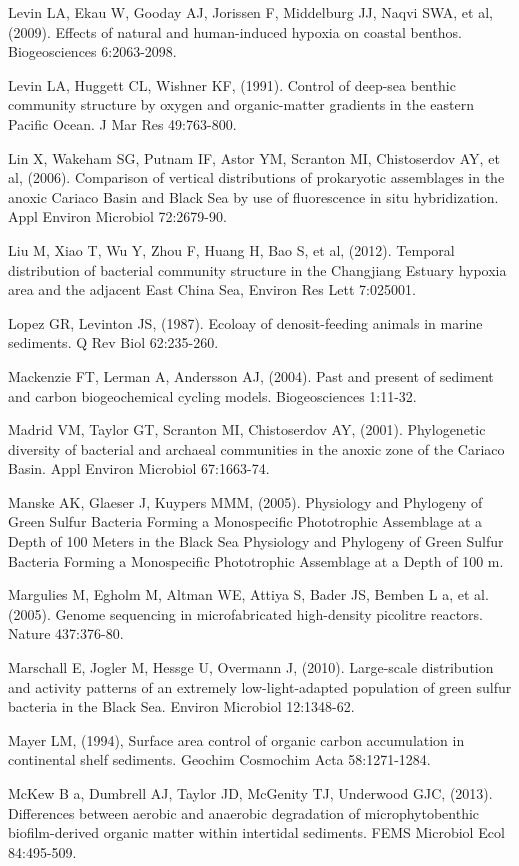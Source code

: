 Levin LA, Ekau W, Gooday AJ, Jorissen F, Middelburg JJ, Naqvi SWA, et al, (2009). Effects of natural and human-induced hypoxia on coastal benthos. Biogeosciences 6:2063-2098.

Levin LA, Huggett CL, Wishner KF, (1991). Control of deep-sea benthic community structure by oxygen and organic-matter gradients in the eastern Pacific Ocean. J Mar Res 49:763-800.

Lin X, Wakeham SG, Putnam IF, Astor YM, Scranton MI, Chistoserdov AY, et al, (2006). Comparison of vertical distributions of prokaryotic assemblages in the anoxic Cariaco Basin and Black Sea by use of fluorescence in situ hybridization. Appl Environ Microbiol 72:2679-90.

Liu M, Xiao T, Wu Y, Zhou F, Huang H, Bao S, et al, (2012). Temporal distribution of bacterial community structure in the Changjiang Estuary hypoxia area and the adjacent East China Sea, Environ Res Lett 7:025001.

Lopez GR, Levinton JS, (1987). Ecoloay of denosit-feeding animals in marine sediments. Q Rev Biol 62:235-260.

Mackenzie FT, Lerman A, Andersson AJ, (2004). Past and present of sediment and carbon biogeochemical cycling models. Biogeosciences 1:11-32.

Madrid VM, Taylor GT, Scranton MI, Chistoserdov AY, (2001). Phylogenetic diversity of bacterial and archaeal communities in the anoxic zone of the Cariaco Basin. Appl Environ Microbiol 67:1663-74.

Manske AK, Glaeser J, Kuypers MMM, (2005). Physiology and Phylogeny of Green Sulfur Bacteria Forming a Monospecific Phototrophic Assemblage at a Depth of 100 Meters in the Black Sea Physiology and Phylogeny of Green Sulfur Bacteria Forming a Monospecific Phototrophic Assemblage at a Depth of 100 m. 

Margulies M, Egholm M, Altman WE, Attiya S, Bader JS, Bemben L a, et al. (2005). Genome sequencing in microfabricated high-density picolitre reactors. Nature 437:376-80.

Marschall E, Jogler M, Hessge U, Overmann J, (2010). Large-scale distribution and activity patterns of an extremely low-light-adapted population of green sulfur bacteria in the Black Sea. Environ Microbiol 12:1348-62.

Mayer LM, (1994), Surface area control of organic carbon accumulation in continental shelf sediments. Geochim Cosmochim Acta 58:1271-1284.

McKew B a, Dumbrell AJ, Taylor JD, McGenity TJ, Underwood GJC, (2013). Differences between aerobic and anaerobic degradation of microphytobenthic biofilm-derived organic matter within intertidal sediments. FEMS Microbiol Ecol 84:495-509.

